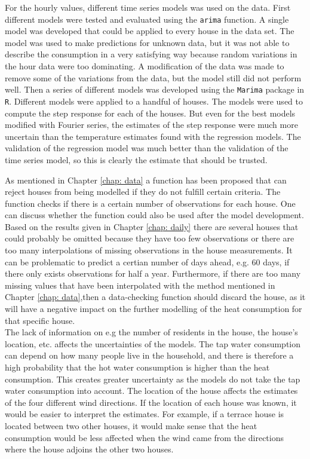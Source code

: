 \noindent For the hourly values, different time series models was used on the data. First different models were tested and evaluated using the \texttt{arima} function. A single model was developed that could be applied to every house in the data set. The model was used to make predictions for unknown data, but it was not able to describe the consumption in a very satisfying way because random variations in the hour data were too dominating. A modification of the data was made to remove some of the variations from the data, but the model still did not perform well. Then a series of different models was developed using the \texttt{Marima} package in \texttt{R}. Different models were applied to a handful of houses. The models were used to compute the step response for each of the houses. But even for the best models modified with Fourier series, the estimates of the step response were much more uncertain than the temperature estimates found with the regression models. The validation of the regression model was much better than the validation of the time series model, so this is clearly the estimate that should be trusted.

\noindent As mentioned in Chapter \ref{chap: data} a function has been proposed that can reject houses from being modelled if they do not fulfill certain criteria. The function checks if there is a certain number of observations for each house. One can discuss whether the function could also be used after the model development. Based on the results given in Chapter \ref{chap: daily} there are several houses that could probably be omitted because they have too few observations or there are too many interpolations of missing observations in the house measurements. It can be problematic to predict a certian number of days ahead, e.g. 60 days, if there only exists observations for half a year. Furthermore, if there are too many missing values ​​that have been interpolated with the method mentioned in Chapter \ref{chap: data},then a data-checking function should discard the house, as it will have a negative impact on the further modelling of the heat consumption for that specific house. \\

\noindent The lack of information on e.g the number of residents in the house, the house's location, etc. affects the uncertainties of the models. The tap water consumption can depend on how many people live in the household, and there is therefore a high probability that the hot water consumption is higher than the heat consumption. This creates greater uncertainty as the models do not take the tap water consumption into account. The location of the house affects the estimates of the four different wind directions. If the location of each house was known, it would be easier to interpret the estimates. For example, if a terrace house is located between two other houses, it would make sense that the heat consumption would be less affected when the wind came from the directions where the house adjoins the other two houses. \\

